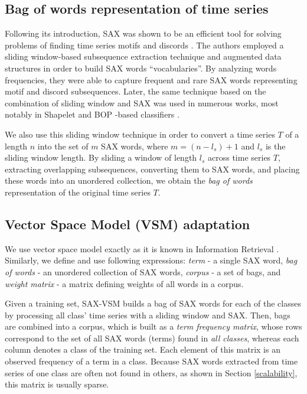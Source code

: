 \documentclass[conference]{IEEEtran}
\begin{document}
\subsection{Bag of words representation of time series} \label{bow_representation}
Following its introduction, SAX was shown to be an efficient tool for solving problems 
of finding time series motifs and discords \cite{hot_sax}.
The authors employed a sliding window-based subsequence extraction technique 
and augmented data structures in order to build SAX words ``vocabularies''.
By analyzing words frequencies, they were able to capture frequent and rare 
SAX words representing motif and discord subsequences. 
Later, the same technique based on the combination of sliding window and SAX 
was used in numerous works, most notably in Shapelet \cite{fast-shapelets}
and BOP -based classifiers \cite{bag_patterns}. 

We also use this sliding window technique in order to convert a time series $T$ of a 
length $n$ into the set of $m$ SAX words, where $m=(n-l_{s})+1$ and $l_{s}$ 
is the sliding window length. 
By sliding a window of length $l_{s}$ across time series $T$, extracting overlapping 
subsequences, converting them to SAX words, and placing these words into an 
unordered collection, we obtain the \textit{bag of words} representation of 
the original time series $T$.

\vspace{-0.1cm}
\subsection{Vector Space Model (VSM) adaptation}
We use vector space model exactly as it is known in Information Retrieval \cite{salton}. 
Similarly, we define and use following expressions:
\textit{term} - a single SAX word, 
\textit{bag of words} - an unordered collection of SAX words, 
\textit{corpus} - a set of bags, and 
\textit{weight matrix} - a matrix defining weights of all words in a corpus. 

Given a training set, SAX-VSM builds a bag of SAX words for each of the 
classes by processing all class' time series with a sliding window and SAX. 
Then, bags are combined into a corpus, which is built as a 
\textit{term frequency matrix}, whose
rows correspond to the set of all SAX words (terms) found in \textit{all classes}, 
whereas each column denotes a class of the training set. 
Each element of this matrix is an observed frequency of a term in a class. 
Because SAX words extracted from time series of one class are often not found 
in others, as shown in Section \ref{scalability}, this matrix is usually sparse. 
\end{document}
